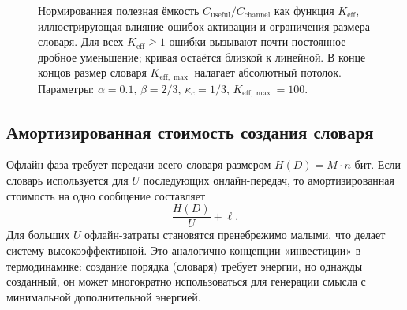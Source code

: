 \documentclass[12pt,a4paper]{article}
\theoremstyle{remark}
\newcommand{\Keff}{K_{\mathrm{eff}}}
\newcommand{\kappac}{\kappa_c}
\newcommand{\Keffmax}{K_{\mathrm{eff},\max}}
\begin{document}
	\begin{figure}[htbp]
		\centering
		\caption{Нормированная полезная ёмкость $C_{\text{useful}}/C_{\text{channel}}$ как функция $\Keff$, иллюстрирующая влияние ошибок активации и ограничения размера словаря. Для всех $K_{\mathrm{eff}} \ge 1$ ошибки вызывают почти постоянное дробное уменьшение; кривая остаётся близкой к линейной. В конце концов размер словаря $\Keffmax$ налагает абсолютный потолок. Параметры: $\alpha=0.1$, $\beta=2/3$, $\kappa_c=1/3$, $\Keffmax=100$.}
		\label{fig:useful-capacity}
	\end{figure}
	
	\subsection{Амортизированная стоимость создания словаря}
	
	Офлайн-фаза требует передачи всего словаря размером $H(D) = M \cdot n$ бит. Если словарь используется для $U$ последующих онлайн-передач, то амортизированная стоимость на одно сообщение составляет
	\[
	\frac{H(D)}{U} + \ell.
	\]
	Для больших $U$ офлайн-затраты становятся пренебрежимо малыми, что делает систему высокоэффективной. Это аналогично концепции «инвестиции» в термодинамике: создание порядка (словаря) требует энергии, но однажды созданный, он может многократно использоваться для генерации смысла с минимальной дополнительной энергией.
	
\end{document}
